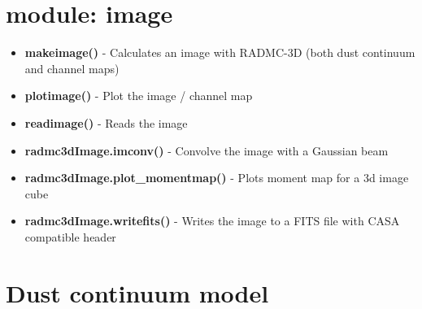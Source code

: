 \documentclass[12pt]{article}
\begin{document}
\section*{module: image}
\begin{itemize}
\item[]{\bf makeimage()} - Calculates an image with RADMC-3D (both dust continuum and channel maps)
\item[]{\bf plotimage()} - Plot the image / channel map
\item[]{\bf readimage()} - Reads the image
\item[]{\bf radmc3dImage.imconv()} - Convolve the image with a Gaussian beam 
\item[]{\bf radmc3dImage.plot\_momentmap()} - Plots moment map for a 3d image cube
\item[]{\bf radmc3dImage.writefits()} - Writes the image to a FITS file with CASA compatible header
\end{itemize}

\newpage
\section*{Dust continuum model} 
\end{document}
